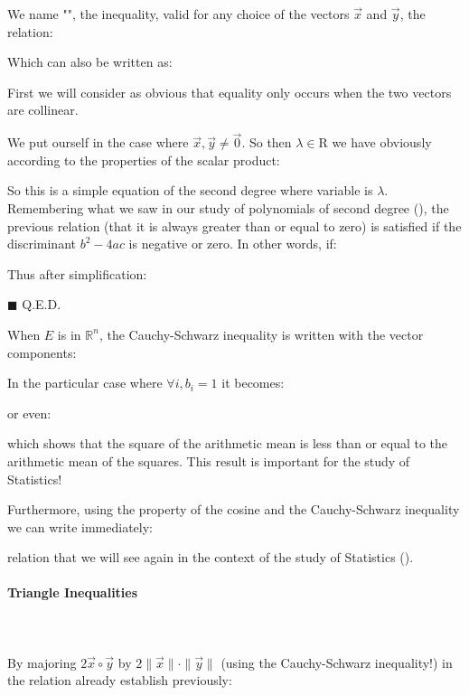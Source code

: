 	\begin{theorem}
	We name "\label{cauchy-schwarz inequality}", the inequality, valid for any choice of the vectors $\vec{x}$ and $\vec{y}$, the relation:
	
	Which can also be written as:
	
	\end{theorem}
	First we will consider as obvious that equality only occurs when the two vectors are collinear.	
	\begin{dem}
	We put ourself in the case where $\vec{x},\vec{y}\neq\vec{0}$. So then $\lambda\in\mathrm{R}$ we have obviously according to the properties of the scalar product:
	
	So this is a simple equation of the second degree where variable is $\lambda$. Remembering what we saw in our study of polynomials of second degree (), the previous relation (that it is always greater than or equal to zero) is satisfied if the discriminant $b^2-4ac$ is negative or zero. In other words, if:
	
	Thus after simplification:
	
	\begin{flushright}
		$\blacksquare$  Q.E.D.
	\end{flushright}
	\end{dem}
	When $E$ is in $\mathbb{R}^n$, the Cauchy-Schwarz inequality is written with the vector components:
	
	In the particular case where $\forall i,b_i=1$ it becomes:
	
	or even:
	
	which shows that the square of the arithmetic mean is less than or equal to the arithmetic mean of the squares. This result is important for the study of Statistics!
	
	Furthermore, using the property of the cosine and the Cauchy-Schwarz inequality we can write immediately:
	
	relation that we will see again in the context of the study of Statistics ().
	
	\paragraph{Triangle Inequalities}\mbox{}\\\\
	By majoring $2\vec{x}\circ\vec{y}$ by $2\|\vec{x}\|\cdot\|\vec{y}\|$ (using the Cauchy-Schwarz inequality!) in the relation already establish previously:
	
